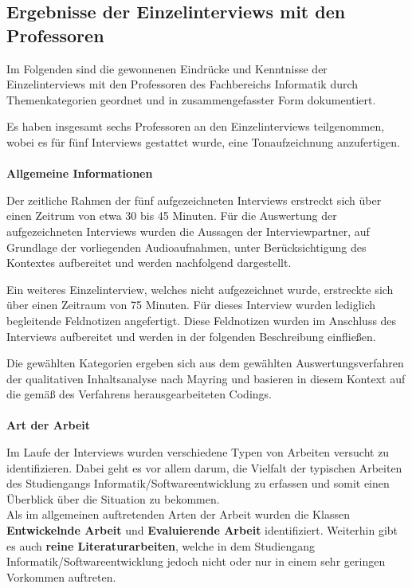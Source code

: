 \documentclass{scrreprt}
\begin{document}
\subsection{Ergebnisse der Einzelinterviews mit den Professoren}
\par Im Folgenden sind die gewonnenen Eindrücke und Kenntnisse der Einzelinterviews mit den Professoren des Fachbereichs Informatik durch Themenkategorien geordnet und in zusammengefasster Form dokumentiert. \\
\par Es haben insgesamt sechs Professoren an den Einzelinterviews teilgenommen, wobei es für fünf Interviews gestattet wurde, eine Tonaufzeichnung anzufertigen.\\\\
\textbf{Allgemeine Informationen}
\par Der zeitliche Rahmen der fünf aufgezeichneten Interviews erstreckt sich über einen Zeitrum von etwa 30 bis 45 Minuten. Für die Auswertung der aufgezeichneten Interviews wurden die Aussagen der Interviewpartner, auf Grundlage der vorliegenden Audioaufnahmen, unter Berücksichtigung des Kontextes aufbereitet und werden nachfolgend dargestellt.\\
\par Ein weiteres Einzelinterview, welches nicht aufgezeichnet wurde, erstreckte sich über einen Zeitraum von 75 Minuten. Für dieses Interview wurden lediglich begleitende Feldnotizen angefertigt. Diese Feldnotizen wurden im Anschluss des Interviews aufbereitet und werden in der folgenden Beschreibung einfließen.\\
\par Die gewählten Kategorien ergeben sich aus dem gewählten Auswertungsverfahren der qualitativen Inhaltsanalyse nach Mayring\cite{Mayring2015} und basieren in diesem Kontext auf die gemäß des Verfahrens herausgearbeiteten Codings.\\\\


\textbf{Art der Arbeit}\\
\par Im Laufe der Interviews wurden verschiedene Typen von Arbeiten versucht zu identifizieren. Dabei geht es vor allem darum, die Vielfalt der typischen Arbeiten des Studiengangs Informatik/Softwareentwicklung zu erfassen und somit einen Überblick über die Situation zu bekommen.\\
Als im allgemeinen auftretenden Arten der Arbeit wurden die Klassen \textbf{Entwickelnde Arbeit}  und \textbf{Evaluierende Arbeit} identifiziert. Weiterhin gibt es auch \textbf{reine Literaturarbeiten}, welche in dem Studiengang Informatik/Softwareentwicklung jedoch nicht oder nur in einem sehr geringen Vorkommen auftreten.\\
\end{document}
